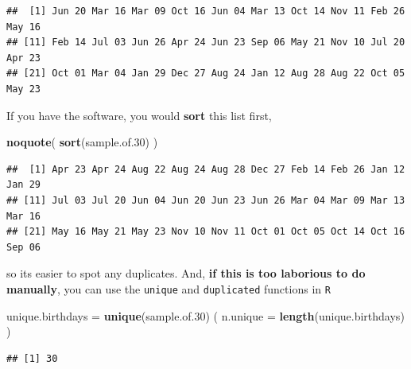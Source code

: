 \documentclass[]{book}
\newenvironment{Shaded}{\begin{snugshade}}{\end{snugshade}}
\newcommand{\DataTypeTok}[1]{\textcolor[rgb]{0.13,0.29,0.53}{#1}}
\newcommand{\DecValTok}[1]{\textcolor[rgb]{0.00,0.00,0.81}{#1}}
\newcommand{\FloatTok}[1]{\textcolor[rgb]{0.00,0.00,0.81}{#1}}
\newcommand{\KeywordTok}[1]{\textcolor[rgb]{0.13,0.29,0.53}{\textbf{#1}}}
\newcommand{\NormalTok}[1]{#1}
\newcommand{\OperatorTok}[1]{\textcolor[rgb]{0.81,0.36,0.00}{\textbf{#1}}}
\newcommand{\OtherTok}[1]{\textcolor[rgb]{0.56,0.35,0.01}{#1}}
\newcommand{\StringTok}[1]{\textcolor[rgb]{0.31,0.60,0.02}{#1}}
\begin{document}
\begin{Shaded}
\end{Shaded}

\begin{verbatim}
##  [1] Jun 20 Mar 16 Mar 09 Oct 16 Jun 04 Mar 13 Oct 14 Nov 11 Feb 26 May 16
## [11] Feb 14 Jul 03 Jun 26 Apr 24 Jun 23 Sep 06 May 21 Nov 10 Jul 20 Apr 23
## [21] Oct 01 Mar 04 Jan 29 Dec 27 Aug 24 Jan 12 Aug 28 Aug 22 Oct 05 May 23
\end{verbatim}

If you have the software, you would \textbf{sort} this list first,

\begin{Shaded}
\begin{Highlighting}[]
\KeywordTok{noquote}\NormalTok{( }\KeywordTok{sort}\NormalTok{(sample.of}\FloatTok{.30}\NormalTok{) )}
\end{Highlighting}
\end{Shaded}

\begin{verbatim}
##  [1] Apr 23 Apr 24 Aug 22 Aug 24 Aug 28 Dec 27 Feb 14 Feb 26 Jan 12 Jan 29
## [11] Jul 03 Jul 20 Jun 04 Jun 20 Jun 23 Jun 26 Mar 04 Mar 09 Mar 13 Mar 16
## [21] May 16 May 21 May 23 Nov 10 Nov 11 Oct 01 Oct 05 Oct 14 Oct 16 Sep 06
\end{verbatim}

so its easier to spot any duplicates. And, \textbf{if this is too laborious to do manually}, you can use the \texttt{unique} and \texttt{duplicated} functions in \texttt{R}

\begin{Shaded}
\begin{Highlighting}[]
\NormalTok{unique.birthdays =}\StringTok{ }\KeywordTok{unique}\NormalTok{(sample.of}\FloatTok{.30}\NormalTok{) }
\NormalTok{( }\DataTypeTok{n.unique =} \KeywordTok{length}\NormalTok{(unique.birthdays) )}
\end{Highlighting}
\end{Shaded}

\begin{verbatim}
## [1] 30
\end{verbatim}
\end{document}
